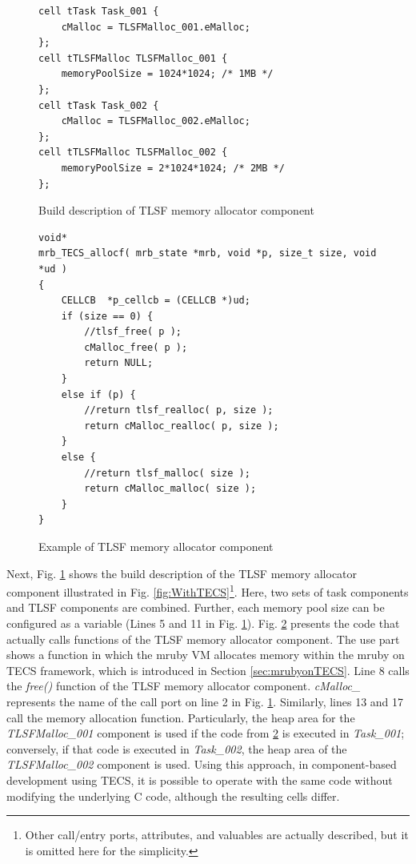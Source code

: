 \documentclass[a4j,12pt,oneside,openany,english]{jsbook}
\begin{document}
\begin{figure}[t]
\centering
\begin{lstlisting}
cell tTask Task_001 {
    cMalloc = TLSFMalloc_001.eMalloc;
};
cell tTLSFMalloc TLSFMalloc_001 {
    memoryPoolSize = 1024*1024; /* 1MB */
};
cell tTask Task_002 {
    cMalloc = TLSFMalloc_002.eMalloc;
};
cell tTLSFMalloc TLSFMalloc_002 {
    memoryPoolSize = 2*1024*1024; /* 2MB */
};
\end{lstlisting}
\caption{Build description of TLSF memory allocator component}
\label{src:TLSFBuild}
\end{figure}


\begin{figure}[t]
\centering
\begin{lstlisting}
void*
mrb_TECS_allocf( mrb_state *mrb, void *p, size_t size, void *ud )
{
    CELLCB	*p_cellcb = (CELLCB *)ud;
    if (size == 0) {
        //tlsf_free( p );
        cMalloc_free( p );
        return NULL;
    }
    else if (p) {
        //return tlsf_realloc( p, size );
        return cMalloc_realloc( p, size );
    }
    else {
        //return tlsf_malloc( size );
        return cMalloc_malloc( size );
    }
}
\end{lstlisting}
\caption{Example of TLSF memory allocator component}  
\label{src:TLSFC}
\end{figure}

Next, Fig. \ref{src:TLSFBuild} shows the build description of the TLSF memory allocator component illustrated in Fig. \ref{fig:WithTECS}\footnote{Other call/entry ports, attributes, and valuables are actually described, but it is omitted here for the simplicity.}.
Here, two sets of task components and TLSF components are combined.
Further, each memory pool size can be configured as a variable (Lines 5 and 11 in Fig. \ref{src:TLSFBuild}).
Fig. \ref{src:TLSFC} presents the code that actually calls functions of the TLSF memory allocator component.
The use part shows a function in which the mruby VM allocates memory within the mruby on TECS framework\cite{par:mrubyonTECS}\cite{par:mrubyonTECS3}, which is introduced in Section \ref{sec:mrubyonTECS}.
Line 8 calls the {\it free()} function of the TLSF memory allocator component.
{\it cMalloc\_} represents the name of the call port on line 2 in Fig. \ref{src:TLSFBuild}.
Similarly, lines 13 and 17 call the memory allocation function.
Particularly, the heap area for the {\it TLSFMalloc\_001} component is used if the code from \ref{src:TLSFC} is executed in {\it Task\_001}; conversely, if that code is executed in {\it Task\_002}, the heap area of the {\it TLSFMalloc\_002} component is used.
Using this approach, in component-based development using TECS, it is possible to operate with the same code without modifying the underlying C code, although the resulting cells differ.
\end{document}

